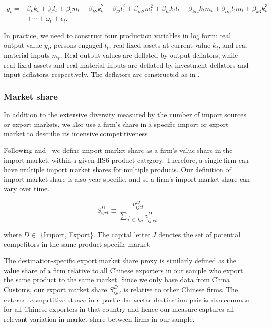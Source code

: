 \documentclass[12pt]{article}
\begin{document}
$$
\begin{aligned}
y_{t}= &\beta_{k} k_{t}+\beta_{l} l_{t}+\beta_{i} m_{t}+\beta_{k 2} k_{t}^{2}+\beta_{l 2} l_{t}^{2}+\beta_{m 2} m_{t}^{2}+\beta_{k l} k_{ t} l_{t}+\beta_{k m} k_{t} m_{t}+\beta_{l m} l_{t} m_{t}+\beta_{k 3} k_{t}^{3}\\
&+\cdots+\omega_{t}+\epsilon_{t}.
\end{aligned}
$$

In practice, we need to construct four production variables in log form: real output value $y_t$, persons engaged $l_t$, real fixed assets at current value $k_t$, and real material inputs $m_t$. Real output values are deflated by output deflators, while real fixed assets and real material inputs are deflated by investment deflators and input deflators, respectively. The deflators are constructed as in \cite{brandt2012}.

\subsubsection{Market share}

In addition to the extensive diversity measured by the number of import sources or export markets, we also use a firm's share in a specific import or export market to describe its intensive competitiveness.

Following \cite{aik2014} and \cite{devereux2017}, we define import market share as a firm’s value share in the import market, within a given HS6 product category. Therefore, a single firm can have multiple import market shares for multiple products. Our definition of import market share is also year specific, and so a firm’s import market share can vary over time. 

$$
S^{D}_{ijct} \equiv \frac{v^{D}_{ijct}}{\sum_{j^{\prime} \in J_{ict}} v^{D}_{ij^{\prime}ct}}
$$

where $D \in$ \{Import, Export\}. The capital letter $J$ denotes the set of potential competitors in the same product-specific market. 

The destination-specific export market share proxy is similarly defined as the value share of a firm relative to all Chinese exporters in our sample who export the same product to the same market. Since we only have data from China Customs, our export market share $S^{D}_{ijct}$ is relative to other Chinese firms. The external competitive stance in a particular sector-destination pair is also common for all Chinese exporters in that country and hence our measure captures all relevant variation in market share between firms in our sample.
\end{document}
